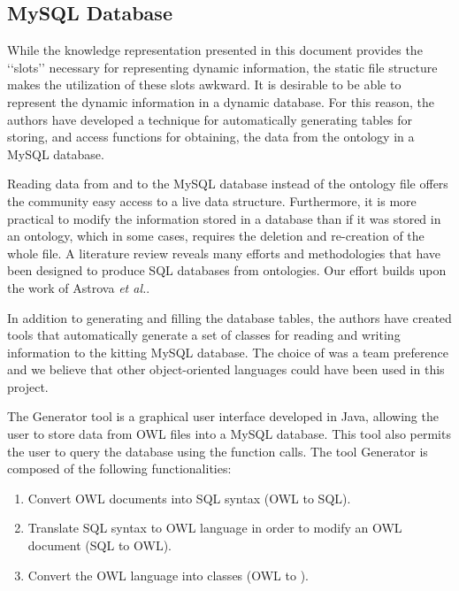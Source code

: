 % 

\subsection{MySQL Database}
While the knowledge representation presented in this document provides the \lq\lq{}slots\rq\rq{} necessary for representing dynamic information, the
static file structure makes the utilization of these slots awkward. It is desirable to be able to represent the dynamic information in a dynamic database.
For this reason, the authors have developed a technique for automatically generating tables for storing,  and access functions
for obtaining, the data from the ontology in a MySQL database.

Reading data from and to the MySQL database instead of the ontology file offers the community easy access to a live data structure. Furthermore, it is more practical to modify the information stored in a database than if it was stored in an ontology, which in some cases, requires the deletion and re-creation of the whole file. A literature review reveals many efforts and methodologies that have been designed to produce SQL databases from ontologies. Our effort builds upon the work of Astrova \textit{et al.}\cite{Astrova2007}.

In addition to generating and filling the database tables, the authors have created tools that automatically generate a set of {\cpp} classes for reading and writing
information to the kitting MySQL database. The choice of {\cpp} was a team preference and we believe that other object-oriented languages could have been used in this project.

The Generator tool is a graphical user interface developed in Java, allowing the user to store data from OWL files into a MySQL database. This tool also permits the user to query the database using the {\cpp} function calls. The tool Generator is composed of the following functionalities:
\begin{enumerate}
 \item Convert OWL documents into SQL syntax (OWL to SQL).
 \item Translate SQL syntax to OWL language in order to modify an OWL document (SQL to OWL).
 \item Convert the OWL language into {\cpp} classes (OWL to {\cpp}).
\end{enumerate}

